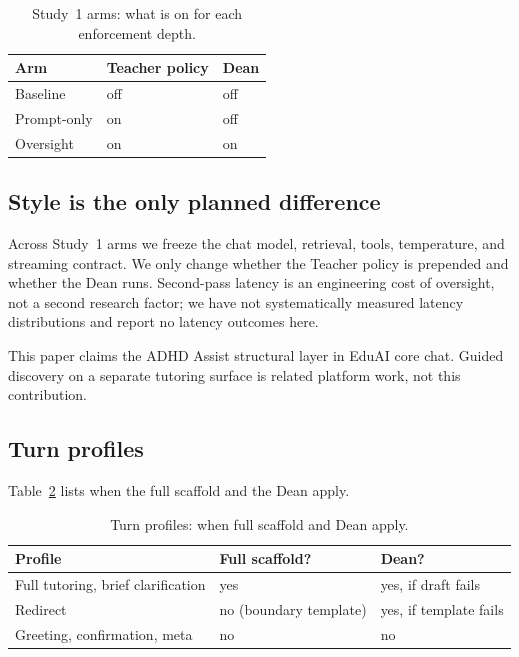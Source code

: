 \begin{table}[t]
\caption{Study~1 arms: what is on for each enforcement depth.}
\label{tab:arms}
\small
\centering
\begin{tabular}{@{}lll@{}}
\toprule
Arm & Teacher policy & Dean \\
\midrule
Baseline & off & off \\
Prompt-only & on & off \\
Oversight & on & on \\
\bottomrule
\end{tabular}
\end{table}

\subsection{Style is the only planned difference}
\label{sec:iv}

Across Study~1 arms we freeze the chat model, retrieval, tools, temperature,
and streaming contract. We only change whether the Teacher policy is prepended
and whether the Dean runs. Second-pass latency is an engineering cost of
oversight, not a second research factor; we have not systematically measured
latency distributions and report no latency outcomes here.

This paper claims the ADHD Assist structural layer in EduAI core chat. Guided
discovery on a separate tutoring surface is related platform work, not this
contribution.

\subsection{Turn profiles}
\label{sec:profiles}

Table~\ref{tab:profiles} lists when the full scaffold and the Dean apply.

\begin{table}[b]
\caption{Turn profiles: when full scaffold and Dean apply.}
\label{tab:profiles}
\small
\centering
\begin{tabular}{@{}lll@{}}
\toprule
Profile & Full scaffold? & Dean? \\
\midrule
Full tutoring, brief clarification & yes & yes, if draft fails \\
Redirect & no (boundary template) & yes, if template fails \\
Greeting, confirmation, meta & no & no \\
\bottomrule
\end{tabular}
\end{table}


